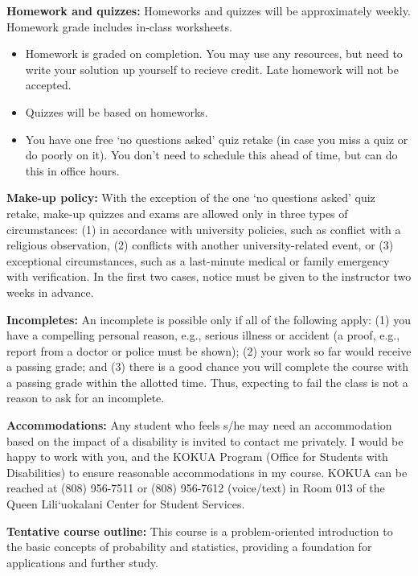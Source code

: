 \documentclass[10pt]{article}
\newcommand{\vt}{\vskip 5mm} %
\newcommand{\Fl}{\vt\noindent\textbf} %
\begin{document}
\Fl{Homework and quizzes:} Homeworks and quizzes will be approximately weekly.
Homework grade includes in-class worksheets.
\begin{itemize}
  \item Homework is graded on completion. You may use any resources, but need
  to write your solution up yourself to recieve credit. Late homework will not
  be accepted.
  \item Quizzes will be based on homeworks.
  \item You have one free `no questions asked' quiz retake (in case you miss a
  quiz or do poorly on it). You don't need to schedule this ahead of time, but
  can do this in office hours.
\end{itemize}

\Fl{Make-up policy:} With the exception of the one `no questions asked' quiz
retake, make-up quizzes and exams are allowed only in three types of
circumstances: (1) in accordance with university policies, such as conflict
with a religious observation, (2) conflicts with another university-related
event, or (3) exceptional circumstances, such as a last-minute medical or
family emergency with verification. In the first two cases, notice must be
given to the instructor two weeks in advance.

\Fl{Incompletes:} An incomplete is possible only if all of the following
apply: (1) you have a compelling personal reason, e.g., serious illness or
accident (a proof, e.g., report from a doctor or police must be shown); (2)
your work so far would receive a passing grade; and (3) there is a good chance
you will complete the course with a passing grade within the allotted time.
Thus, expecting to fail the class is not a reason to ask for an incomplete.

\Fl{Accommodations:} Any student who feels s/he may need an accommodation
based on the impact of a disability is invited to contact me privately. I
would be happy to work with you, and the KOKUA Program (Office for Students
with Disabilities) to ensure reasonable accommodations in my course. KOKUA can
be reached at (808) 956-7511 or (808) 956-7612 (voice/text) in Room 013 of the
Queen Lili`uokalani Center for Student Services.


\Fl{Tentative course outline:} This course is a problem-oriented introduction
to the basic concepts of probability and statistics, providing a foundation
for applications and further study.
\end{document}
